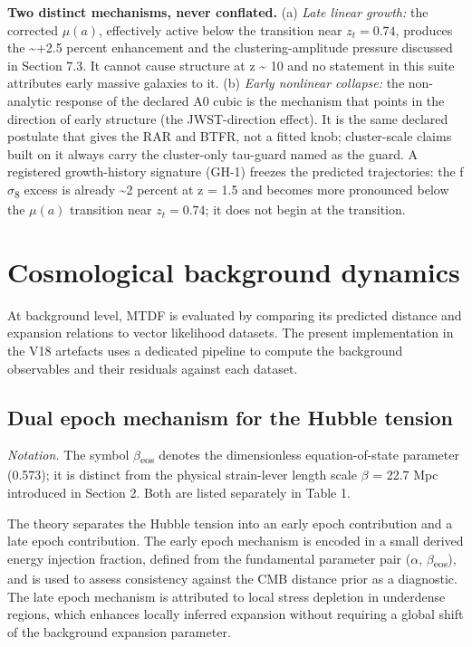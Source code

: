 \documentclass[11pt,a4paper]{article}
\begin{document}
\textbf{Two distinct mechanisms, never conflated.} (a) \emph{Late linear growth:} the corrected \(\mu(a)\), effectively active below the transition near \(z_t = 0.74\), produces the \~{}+2.5 percent enhancement and the clustering-amplitude pressure discussed in Section 7.3. It cannot cause structure at z \~{} 10 and no statement in this suite attributes early massive galaxies to it. (b) \emph{Early nonlinear collapse:} the non-analytic response of the declared A0 cubic is the mechanism that points in the direction of early structure (the JWST-direction effect). It is the same declared postulate that gives the RAR and BTFR, not a fitted knob; cluster-scale claims built on it always carry the cluster-only tau-guard named as the guard. A registered growth-history signature (GH-1) freezes the predicted trajectories: the f$\sigma$\textsubscript{8} excess is already \~{}2 percent at z = 1.5 and becomes more pronounced below the \(\mu(a)\) transition near \(z_t = 0.74\); it does not begin at the transition.

\section{Cosmological background dynamics}
\label{sec:sec3}
At background level, MTDF is evaluated by comparing its predicted distance and expansion relations to vector likelihood datasets. The present implementation in the V18 artefacts uses a dedicated pipeline to compute the background observables and their residuals against each dataset.

\subsection{Dual epoch mechanism for the Hubble tension}
\emph{Notation.} The symbol $\beta$\textsubscript{eos} denotes the dimensionless equation-of-state parameter (0.573); it is distinct from the physical strain-lever length scale $\beta$ = 22.7 Mpc introduced in Section 2. Both are listed separately in Table 1.

The theory separates the Hubble tension into an early epoch contribution and a late epoch contribution. The early epoch mechanism is encoded in a small derived energy injection fraction, defined from the fundamental parameter pair ($\alpha$, $\beta$\textsubscript{eos}), and is used to assess consistency against the CMB distance prior as a diagnostic. The late epoch mechanism is attributed to local stress depletion in underdense regions, which enhances locally inferred expansion without requiring a global shift of the background expansion parameter.
\end{document}
